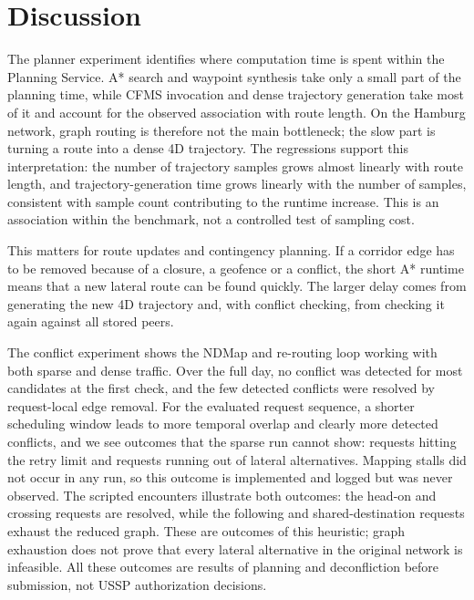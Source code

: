 \section{Discussion}
\label{sec:discussion}

The planner experiment identifies where computation time is spent within the Planning Service. A* search and waypoint synthesis take only a small part of the planning time, while CFMS invocation and dense trajectory generation take most of it and account for the observed association with route length. On the Hamburg network, graph routing is therefore not the main bottleneck; the slow part is turning a route into a dense 4D trajectory. The regressions support this interpretation: the number of trajectory samples grows almost linearly with route length, and trajectory-generation time grows linearly with the number of samples, consistent with sample count contributing to the runtime increase. This is an association within the benchmark, not a controlled test of sampling cost.

This matters for route updates and contingency planning. If a corridor edge has to be removed because of a closure, a geofence or a conflict, the short A* runtime means that a new lateral route can be found quickly. The larger delay comes from generating the new 4D trajectory and, with conflict checking, from checking it again against all stored peers.

The conflict experiment shows the NDMap and re-routing loop working with both sparse and dense traffic. Over the full day, no conflict was detected for most candidates at the first check, and the few detected conflicts were resolved by request-local edge removal. For the evaluated request sequence, a shorter scheduling window leads to more temporal overlap and clearly more detected conflicts, and we see outcomes that the sparse run cannot show: requests hitting the retry limit and requests running out of lateral alternatives. Mapping stalls did not occur in any run, so this outcome is implemented and logged but was never observed. The scripted encounters illustrate both outcomes: the head-on and crossing requests are resolved, while the following and shared-destination requests exhaust the reduced graph. These are outcomes of this heuristic; graph exhaustion does not prove that every lateral alternative in the original network is infeasible. All these outcomes are results of planning and deconfliction before submission, not USSP authorization decisions.

